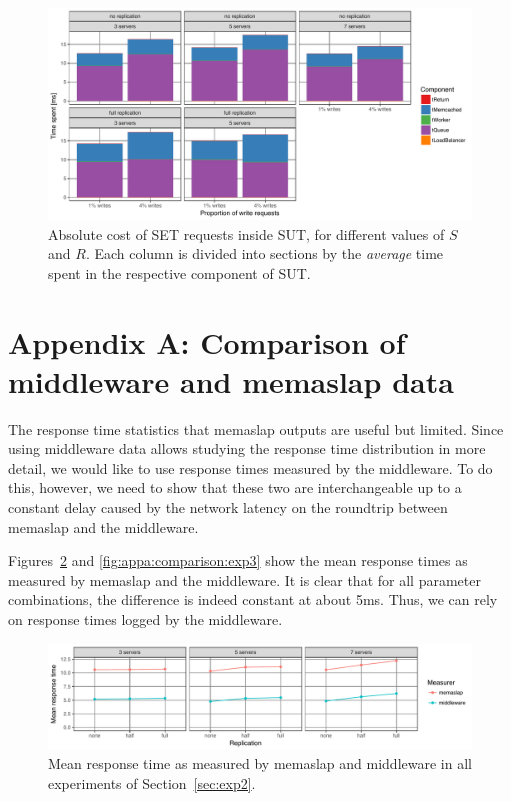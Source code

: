 \documentclass[11pt]{article}
\begin{document}
\begin{figure}[h]
\centering
\includegraphics[width=\textwidth]{../results/writes/graphs/time_breakdown_vs_writes_set_abs.pdf}
\caption{Absolute cost of SET requests inside SUT, for different values of $S$ and $R$. Each column is divided into sections by the \emph{average} time spent in the respective component of SUT.}
\label{fig:exp3:res:breakdown:set:abs}
\end{figure}

\clearpage

\section*{Appendix A: Comparison of middleware and memaslap data}
\label{sec:appa}

The response time statistics that memaslap outputs are useful but limited. Since using middleware data allows studying the response time distribution in more detail, we would like to use response times measured by the middleware. To do this, however, we need to show that these two are interchangeable up to a constant delay caused by the network latency on the roundtrip between memaslap and the middleware.

Figures~\ref{fig:appa:comparison:exp2} and \ref{fig:appa:comparison:exp3} show the mean response times as measured by memaslap and the middleware. It is clear that for all parameter combinations, the difference is indeed constant at about 5ms. Thus, we can rely on response times logged by the middleware.

\begin{figure}[h]
\centering
\includegraphics[width=\textwidth]{../results/replication/graphs/compare_mw_ms.pdf}
\caption{Mean response time as measured by memaslap and middleware in all experiments of Section~\ref{sec:exp2}.}
\label{fig:appa:comparison:exp2}
\end{figure}
\end{document}
